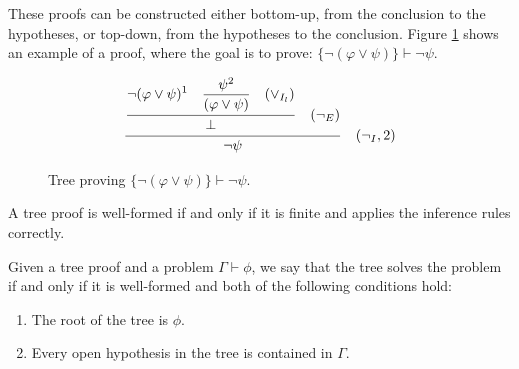 These proofs can be constructed either bottom-up, from the conclusion to the hypotheses, or top-down, from the hypotheses to the conclusion. Figure \ref{tab:proof-tree} shows an example of a proof, where the goal is to prove: \( \{\neg (\varphi \lor \psi)\} \vdash \neg \psi \).

\begin{figure}
    \centering
    \[
    \frac{\displaystyle \frac{
    \displaystyle \neg (\varphi \lor \psi)^1 \quad \displaystyle \frac{\psi^2}{(\varphi \lor \psi) \strut} \quad (\lor_{I_l}) \strut}
    {\displaystyle \bot \strut} \quad (\displaystyle \neg_E)\strut} {\displaystyle \neg \psi \strut} \quad (\neg_I, 2)
    \]
    \caption{Tree proving \( \{\neg (\varphi \lor \psi)\} \vdash \neg \psi \).}
    \label{tab:proof-tree}
\end{figure}


\begin{definition}
A tree proof is well-formed if and only if it is finite and applies the inference rules correctly.
\end{definition}

\begin{definition}
Given a tree proof and a problem \(\Gamma \vdash \phi\), we say that the tree solves the problem if and only if it is well-formed and both of the following conditions hold:
\begin{enumerate}
    \item The root of the tree is \(\phi\).
    \item Every open hypothesis in the tree is contained in \(\Gamma\).
\end{enumerate}
\end{definition}